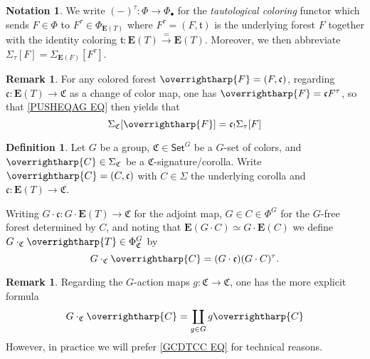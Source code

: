 \documentclass[a4paper,10pt
,draft
]{article}%
\numberwithin{equation}{section}
\numberwithin{figure}{section}
\theoremstyle{definition} %
\newtheorem{definition}[equation]{Definition}%
\newtheorem{remark}[equation]{Remark}%
\newtheorem{notation}[equation]{Notation}%
\newcommand{\vect}[1]{\text{\overrightharp{\ensuremath{#1}}}}
\newcommand{\1}{\ensuremath{\mathbbm 1}}%
\begin{document}
\begin{notation}
We write $(-)^{\tau} \colon \Phi \to \Phi_{\bullet}$
for the \emph{tautological coloring} functor
which sends $F \in \Phi$ to 
$F^{\tau} \in \Phi_{\boldsymbol{E}(T)}$
where
$F^{\tau} = (F,\mathfrak{t})$ is the underlying forest $F$
together with the identity coloring
$\mathfrak{t} \colon \boldsymbol{E}(T) \xrightarrow{=} \boldsymbol{E}(T)$.
Moreover, we then abbreviate 
$\Sigma_{\tau}[F] = \Sigma_{\boldsymbol{E}(F)}[F^{\tau}]$.
\end{notation}


\begin{remark}
For any colored forest $\vect{F}=(F,\mathfrak{c})$,
regarding $\mathfrak{c} \colon \boldsymbol{E}(T) \to \mathfrak{C}$
as a change of color map, 
one has $\vect{F} = \mathfrak{c} F^{\tau}$,
so that \eqref{PUSHEQAG EQ} then yields that
\begin{equation}\label{CANPUSH EQ}
\Sigma_{\mathfrak{C}}[\vect{F}] = 
\mathfrak{c}_! \Sigma_{\tau}[F]
\end{equation}
\end{remark}


\begin{definition}
Let $G$ be a group,
$\mathfrak{C} \in \mathsf{Set}^G$
be a $G$-set of colors, 
and $\vect{C} \in \Sigma_{\mathfrak{C}}$ be a $\mathfrak{C}$-signature/corolla.
Write
$\vect{C} = (C,\mathfrak{c})$
with $C\in \Sigma$ the underlying corolla
and 
$\mathfrak{c} \colon \boldsymbol{E}(T) \to \mathfrak{C}$.

Writing 
$G \cdot \mathfrak{c} \colon G \cdot \boldsymbol{E}(T) \to \mathfrak{C}$
for the adjoint map, 
$G \in C \in \Phi^G$
for the $G$-free forest determined by $C$,
and noting that
$\boldsymbol{E}(G \cdot C) \simeq 
G \cdot \boldsymbol{E}(C)$
we define $G \cdot_{\mathfrak{C}} \vect{T} \in \Phi^G_{\mathfrak{C}}$ by
\begin{equation}\label{GCDTCC EQ}
G \cdot_{\mathfrak{C}} \vect{C} = 
(G \cdot \mathfrak{c})(G \cdot C)^{\tau}.
\end{equation}
\end{definition}



\begin{remark}
Regarding the $G$-action maps 
$g \colon \mathfrak{C} \to \mathfrak{C}$,
one has the more explicit formula
\[
G \cdot_{\mathfrak{C}} \vect{C}
= 
\coprod_{g \in G}
g \vect{C}
\]
However, in practice
we will prefer \eqref{GCDTCC EQ} for technical reasons.
\end{remark}
\end{document}
